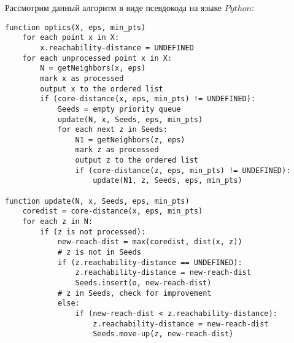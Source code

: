 Рассмотрим данный алгоритм в виде псевдокода на языке $Python$:
\begin{lstlisting}
function optics(X, eps, min_pts)
    for each point x in X:
        x.reachability-distance = UNDEFINED
    for each unprocessed point x in X:
        N = getNeighbors(x, eps)
        mark x as processed
        output x to the ordered list
        if (core-distance(x, eps, min_pts) != UNDEFINED):
            Seeds = empty priority queue
            update(N, x, Seeds, eps, min_pts)
            for each next z in Seeds:
                N1 = getNeighbors(z, eps)
                mark z as processed
                output z to the ordered list
                if (core-distance(z, eps, min_pts) != UNDEFINED):
                    update(N1, z, Seeds, eps, min_pts)

function update(N, x, Seeds, eps, min_pts)
    coredist = core-distance(x, eps, min_pts)
    for each z in N:
        if (z is not processed):
            new-reach-dist = max(coredist, dist(x, z))
            # z is not in Seeds
            if (z.reachability-distance == UNDEFINED):
                z.reachability-distance = new-reach-dist
                Seeds.insert(o, new-reach-dist)
            # z in Seeds, check for improvement
            else:
                if (new-reach-dist < z.reachability-distance):
                    z.reachability-distance = new-reach-dist
                    Seeds.move-up(z, new-reach-dist)
\end{lstlisting}